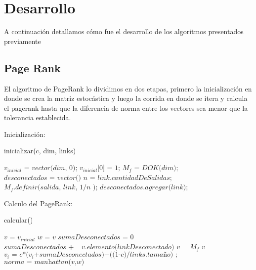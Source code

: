 \section{Desarrollo}

A continuación detallamos cómo fue el desarrollo de los algoritmos presentados previamente

\subsection{Page Rank}
El algoritmo de PageRank lo dividimos en dos etapas, primero la inicializaci\'on en donde se crea la matriz estoc\'astica y luego la corrida en donde se itera y calcula el pagerank hasta que la diferencia de norma entre los vectores sea menor que la tolerancia establecida.


Inicializaci\'on:


\begin{algorithm}
\caption{inicializar(c, dim, links)}\label{euclid}
\begin{algorithmic}[1]
\State $\textit{$v_{inicial}$ = vector(dim, 0);}$ 
\State $\textit{$v_{inicial}$[0] = 1;}$ 
\State $\textit{$M_f$ = DOK(dim);}$ 
\State $\textit{desconectados = vector()}$ 
		\State $\textit{n = link.cantidadDeSalidas;}$
			\State $\textit{$M_f$.definir(salida, link, 1/n );}$ 
		\EndFor
		\Else
			\State $\textit{desconectados.agregar(link);}$ 
	\EndIf
\EndFor
\end{algorithmic}
\end{algorithm}

Calculo del PageRank:


\begin{algorithm}
\caption{calcular()}\label{euclid}
\begin{algorithmic}[1]
\State  $\textit{v = $v_{inicial}$}$
 
	\State $\textit{w = v}$ 
	\State  $\textit{sumaDesconectados = 0}$
		\State $\textit{sumaDesconectados += v.elemento(linkDesconectado)}$ \Comment{}
	\EndFor
	\State $\textit{v = $M_f$ v}$ 
		\State $\textit{$v_i$ = c*($v_i$+sumaDesconectados)+((1-c)/links.tamaño)  ;}$ \Comment{}
	\EndFor
	\State $\textit{norma = manhattan(v,w)}$ 
\EndWhile
\end{algorithmic}
\end{algorithm}
 

